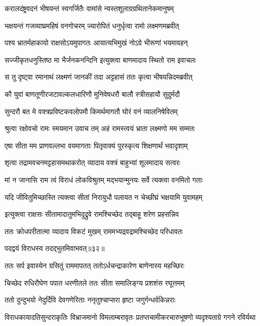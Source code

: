 \twolineshloka
{करालदंष्ट्रवदनं भीषयन्तं स्वगर्जितैः}
{वामांसे न्यस्तशूलाग्रग्रथितानेकमानुषम्} %

\twolineshloka
{भक्षयन्तं गजव्याघ्रमहिषं वनगोचरम्}
{ज्यारोपितं धनुर्धृत्वा रामो लक्ष्मणमब्रवीत्} %

\twolineshloka
{पश्य भ्रातर्महाकायो राक्षसोऽयमुपागतः}
{आयात्यभिमुखं नोऽग्रे भीरूणां भयमावहन्} %

\twolineshloka
{सज्जीकृतधनुस्तिष्ठ मा भैर्जनकनन्दिनि}
{इत्युक्त्वा बाणमादाय स्थितो राम इवाचलः} %

\twolineshloka
{स तु दृष्ट्वा रमानाथं लक्ष्मणं जानकीं तदा}
{अट्टहासं ततः कृत्वा भीषयन्निदमब्रवीत्} %

\twolineshloka
{कौ युवां बाणतूणीरजटावल्कलधारिणौ}
{मुनिवेषधरौ बालौ स्त्रीसहायौ सुदुर्मदौ} %

\twolineshloka
{सुन्दरौ बत मे वक्त्रप्रविष्टकवलोपमौ}
{किमर्थमागतौ घोरं वनं व्यालनिषेवितम्} %

\twolineshloka
{श्रुत्वा रक्षोवचो रामः स्मयमान उवाच तम्}
{अहं रामस्त्वयं भ्राता लक्ष्मणो मम सम्मतः} %

\twolineshloka
{एषा सीता मम प्राणवल्लभा वयमागताः}
{पितृवाक्यं पुरस्कृत्य शिक्षणार्थं भवादृशाम्} %

\twolineshloka
{शृत्वा तद्रामवचनमट्टहासमथाकरोत्}
{व्यादाय वक्त्रं बाहुभ्यां शूलमादाय सत्वरः} %

\twolineshloka
{मां न जानासि राम त्वं विराधं लोकविश्रुतम्}
{मद्भयान्मुनयः सर्वे त्यक्त्वा वनमितो गताः} %

\twolineshloka
{यदि जीवितुमिच्छास्ति त्यक्त्वा सीतां निरायुधौ}
{पलायत न चेच्छीघ्रं भक्षयामि युवामहम्} %

\twolineshloka
{इत्युक्त्वा राक्षसः सीतामादातुमभिदुद्रुवे}
{रामश्चिच्छेद तद्बाहू शरेण प्रहसन्निव} %

\twolineshloka
{ततः क्रोधपरीतात्मा व्यादाय विकटं मुखम्}
{राममभ्यद्रवद्रामश्चिच्छेद परिधावतः} %

{पदद्वयं विराधस्य तदद्भुतमिवाभवत्॥३२॥} %


\twolineshloka
{ततः सर्प इवास्येन ग्रसितुं राममापतत्}
{ततोऽर्धचन्द्राकारेण बाणेनास्य महच्छिरः} %

\twolineshloka
{चिच्छेद रुधिरौघेण पपात धरणीतले}
{ततः सीता समालिङ्ग्य प्रशशंस रघूत्तमम्} %

\twolineshloka
{ततो दुन्दुभयो नेदुर्दिवि देवगणेरिताः}
{ननृतुश्चाप्सरा हृष्टा जगुर्गन्धर्वकिन्नराः} %

\fourlineindentedshloka
{विराधकायादतिसुन्दराकृतिः}
{विभ्राजमानो विमलाम्बरावृतः}
{प्रतप्तचामीकरचारुभूषणो}
{व्यदृश्यताग्रे गगने रविर्यथा} %

